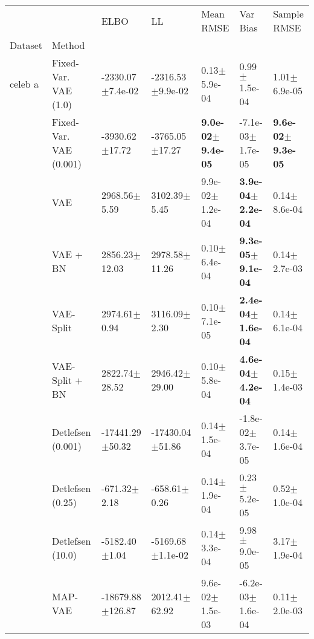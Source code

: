 \begin{tabular}{lllllll}
\toprule
      &            &                         ELBO &                           LL &                     Mean RMSE &                       Var Bias &                   Sample RMSE \\
Dataset & Method &                              &                              &                               &                                &                               \\
\midrule
celeb a & Fixed-Var. VAE (1.0) &         -2330.07$\pm$7.4e-02 &         -2316.53$\pm$9.9e-02 &              0.13$\pm$5.9e-04 &               0.99$\pm$1.5e-04 &              1.01$\pm$6.9e-05 \\
      & Fixed-Var. VAE (0.001) &           -3930.62$\pm$17.72 &           -3765.05$\pm$17.27 &  \textbf{9.0e-02$\pm$9.4e-05} &           -7.1e-03$\pm$1.7e-05 &  \textbf{9.6e-02$\pm$9.3e-05} \\
      & VAE &             2968.56$\pm$5.59 &             3102.39$\pm$5.45 &           9.9e-02$\pm$1.2e-04 &   \textbf{3.9e-04$\pm$2.2e-04} &              0.14$\pm$8.6e-04 \\
      & VAE + BN &            2856.23$\pm$12.03 &            2978.58$\pm$11.26 &              0.10$\pm$6.4e-04 &   \textbf{9.3e-05$\pm$9.1e-04} &              0.14$\pm$2.7e-03 \\
      & VAE-Split &             2974.61$\pm$0.94 &             3116.09$\pm$2.30 &              0.10$\pm$7.1e-05 &   \textbf{2.4e-04$\pm$1.6e-04} &              0.14$\pm$6.1e-04 \\
      & VAE-Split + BN &            2822.74$\pm$28.52 &            2946.42$\pm$29.00 &              0.10$\pm$5.8e-04 &   \textbf{4.6e-04$\pm$4.2e-04} &              0.15$\pm$1.4e-03 \\
      & Detlefsen (0.001) &          -17441.29$\pm$50.32 &          -17430.04$\pm$51.86 &              0.14$\pm$1.5e-04 &           -1.8e-02$\pm$3.7e-05 &              0.14$\pm$1.6e-04 \\
      & Detlefsen (0.25) &             -671.32$\pm$2.18 &             -658.61$\pm$0.26 &              0.14$\pm$1.9e-04 &               0.23$\pm$5.2e-05 &              0.52$\pm$1.0e-04 \\
      & Detlefsen (10.0) &            -5182.40$\pm$1.04 &         -5169.68$\pm$1.1e-02 &              0.14$\pm$3.3e-04 &               9.98$\pm$9.0e-05 &              3.17$\pm$1.9e-04 \\
      & MAP-VAE &         -18679.88$\pm$126.87 &            2012.41$\pm$62.92 &           9.6e-02$\pm$1.5e-03 &           -6.2e-03$\pm$1.6e-04 &              0.11$\pm$2.0e-03 \\

\end{tabular}
